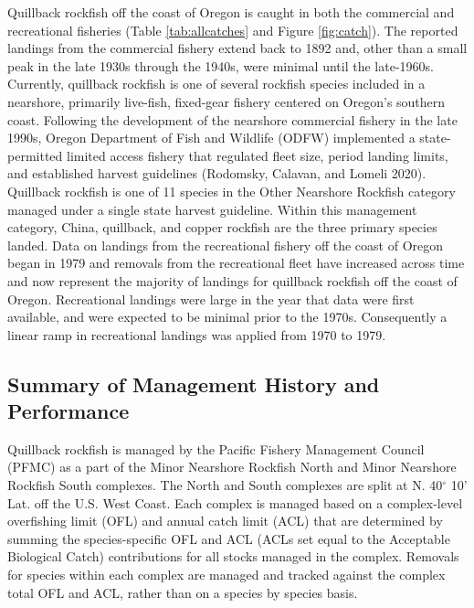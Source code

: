 \documentclass[11pt,
  english,
  a4paper,
]{article}
\begin{document}
\leavevmode\tagmcend\tagstructend


Quillback rockfish off the coast of Oregon is caught in both the commercial and recreational fisheries (Table \ref{tab:allcatches} and Figure \ref{fig:catch}). The reported landings from the commercial fishery extend back to 1892 and, other than a small peak in the late 1930s through the 1940s, were minimal until the late-1960s. Currently, quillback rockfish is one of several rockfish species included in a nearshore, primarily live-fish, fixed-gear fishery centered on Oregon's southern coast. Following the development of the nearshore commercial fishery in the late 1990s, Oregon Department of Fish and Wildlife (ODFW) implemented a state-permitted limited access fishery that regulated fleet size, period landing limits, and established harvest guidelines {(Rodomsky, Calavan, and Lomeli 2020)\leavevmode\tagmcend\tagstructend}. Quillback rockfish is one of 11 species in the Other Nearshore Rockfish category managed under a single state harvest guideline. Within this management category, China, quillback, and copper rockfish are the three primary species landed. Data on landings from the recreational fishery off the coast of Oregon began in 1979 and removals from the recreational fleet have increased across time and now represent the majority of landings for quillback rockfish off the coast of Oregon. Recreational landings were large in the year that data were first available, and were expected to be minimal prior to the 1970s. Consequently a linear ramp in recreational landings was applied from 1970 to 1979.

\leavevmode\tagmcend\tagstructend\par


\hypertarget{summary-of-management-history-and-performance}{%
\subsection{Summary of Management History and Performance}\label{summary-of-management-history-and-performance}}

\leavevmode\tagmcend\tagstructend


Quillback rockfish is managed by the Pacific Fishery Management Council (PFMC) as a part of the Minor Nearshore Rockfish North and Minor Nearshore Rockfish South complexes. The North and South complexes are split at N. 40{\(^\circ\)\leavevmode\tagmcend\tagstructend} 10' Lat. off the U.S. West Coast. Each complex is managed based on a complex-level overfishing limit (OFL) and annual catch limit (ACL) that are determined by summing the species-specific OFL and ACL (ACLs set equal to the Acceptable Biological Catch) contributions for all stocks managed in the complex. Removals for species within each complex are managed and tracked against the complex total OFL and ACL, rather than on a species by species basis.
\end{document}
